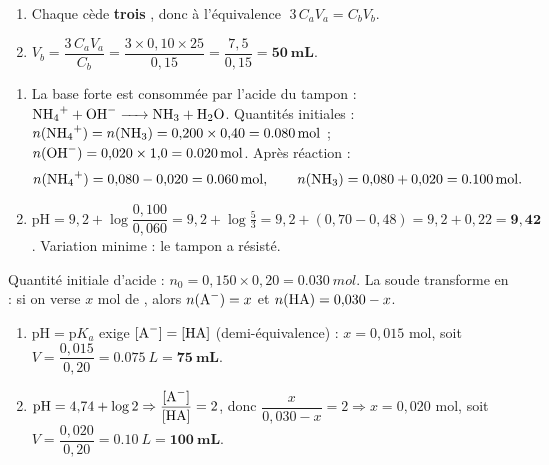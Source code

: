 \documentclass[11pt,a4paper]{article}
\begin{document}

\begin{corrige}
\begin{enumerate}[label=\alph*)]
  \item Chaque  cède \textbf{trois} , donc à l'équivalence $\;3\,C_a V_a = C_b V_b$.
  \item $V_b = \dfrac{3\,C_a V_a}{C_b} = \dfrac{3 \times 0{,}10 \times 25}{0{,}15} = \dfrac{7{,}5}{0{,}15}
        = \mathbf{50\ mL}$.
\end{enumerate}
\end{corrige}

\begin{corrige}
\begin{enumerate}[label=\alph*)]
  \item La base forte est consommée par l'acide du tampon : $\ce{NH4+ + OH- -> NH3 + H2O}$. Quantités
        initiales : $n(\ce{NH4+}) = n(\ce{NH3}) = 0{,}200\times0{,}40 = \qty{0,080}{mol}$ ;
        $n(\ce{OH-}) = 0{,}020\times1{,}0 = \qty{0,020}{mol}$. Après réaction :
        \[ n(\ce{NH4+}) = 0{,}080 - 0{,}020 = \qty{0,060}{mol},\qquad n(\ce{NH3}) = 0{,}080 + 0{,}020 = \qty{0,100}{mol}. \]
  \item $\mathrm{pH} = 9{,}2 + \log\dfrac{0{,}100}{0{,}060} = 9{,}2 + \log\tfrac{5}{3}
        = 9{,}2 + (0{,}70 - 0{,}48) = 9{,}2 + 0{,}22 = \mathbf{9{,}42}$. Variation minime : le tampon a résisté.
\end{enumerate}
\end{corrige}

\begin{corrige}
Quantité initiale d'acide : $n_0 = 0{,}150 \times 0{,}20 = \qty{0,030}{mol}$. La soude transforme 
en  : si on verse $x$ mol de , alors $n(\ce{A-}) = x$ et $n(\ce{HA}) = 0{,}030 - x$.
\begin{enumerate}[label=\alph*)]
  \item $\mathrm{pH} = \mathrm{p}K_a$ exige $[\ce{A-}] = [\ce{HA}]$ (demi-équivalence) : $x = 0{,}015$ mol, soit
        $V = \dfrac{0{,}015}{0{,}20} = \qty{0,075}{L} = \mathbf{75\ mL}$.
  \item $\mathrm{pH} = 4{,}74 + \log 2 \Rightarrow \dfrac{[\ce{A-}]}{[\ce{HA}]} = 2$, donc
        $\dfrac{x}{0{,}030 - x} = 2 \Rightarrow x = 0{,}020$ mol, soit $V = \dfrac{0{,}020}{0{,}20}
        = \qty{0,10}{L} = \mathbf{100\ mL}$.
\end{enumerate}
\end{corrige}
\end{document}
